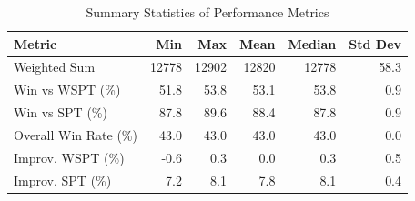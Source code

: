 \begin{table}[htbp]%
\centering%
\begin{tabular}{lrrrrr}%
\toprule%
\textbf{Metric}&\textbf{Min}&\textbf{Max}&\textbf{Mean}&\textbf{Median}&\textbf{Std Dev}\\%
\midrule%
Weighted Sum&12778&12902&12820&12778&58.3\\%
Win vs WSPT (\%)&51.8&53.8&53.1&53.8&0.9\\%
Win vs SPT (\%)&87.8&89.6&88.4&87.8&0.9\\%
Overall Win Rate (\%)&43.0&43.0&43.0&43.0&0.0\\%
Improv. WSPT (\%)&-0.6&0.3&0.0&0.3&0.5\\%
Improv. SPT (\%)&7.2&8.1&7.8&8.1&0.4\\%
\bottomrule%
\end{tabular}%
\caption{Summary Statistics of Performance Metrics}%
\label{tab:metrics}%
\end{table}